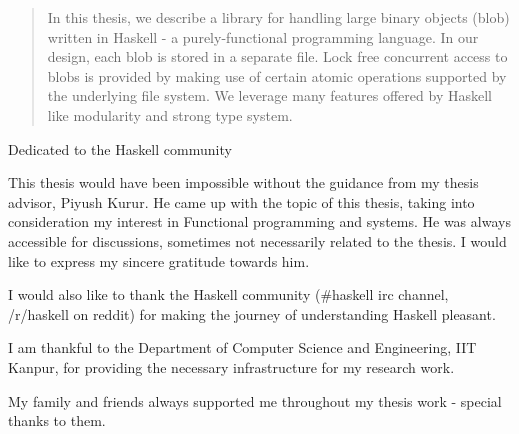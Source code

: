 \begin{abstract}
  In this thesis, we describe a library for handling large binary objects (blob) written in Haskell - a purely-functional programming language. In our design, each blob is stored in a separate file. Lock free concurrent access to blobs is provided by making use of certain atomic operations supported by the underlying file system. We leverage many features offered by Haskell like modularity and strong type system.

\end{abstract}

\begin{dedication}
  Dedicated to the Haskell community
\end{dedication}

\begin{acknowledgments}
  This thesis would have been impossible without the guidance from my thesis advisor, Piyush Kurur.
  He came up with the topic of this thesis, taking into consideration my interest in Functional programming and
  systems. He was always accessible for discussions, sometimes not necessarily related to the thesis.
  I would like to express my sincere gratitude towards him.

  I would also like to thank the Haskell community (\#haskell irc channel, /r/haskell on reddit) for making
  the journey of understanding Haskell pleasant.

  I am thankful to the Department of Computer Science and Engineering, IIT Kanpur, for
  providing the necessary infrastructure for my research work.

  My family and friends always supported me throughout my thesis work - special thanks to them.
\end{acknowledgments}

\tableofcontents
\listoftables

\cleardoublepage
\listoffigures


\cleardoublepage{} %
